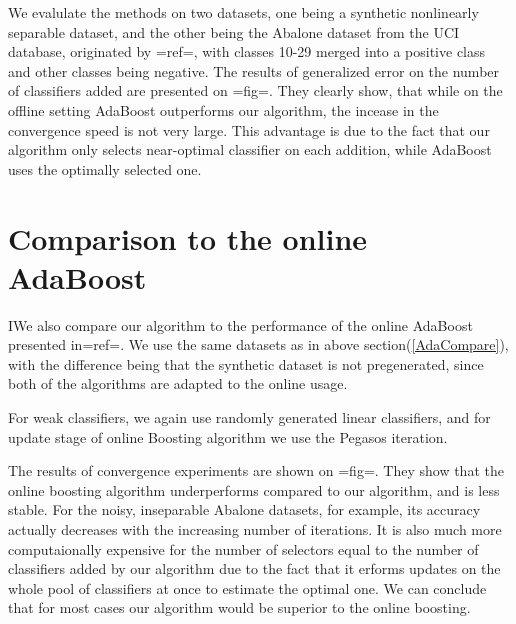 We evalulate the methods on two datasets, one being a synthetic nonlinearly separable dataset, and the other  being the Abalone dataset from the UCI database, originated by {{=ref=}}, with classes 10-29 merged into a positive class and other classes being negative. The results of generalized error on the number of classifiers added are presented on {{=fig=}}. They clearly show, that while on the offline setting AdaBoost outperforms our algorithm, the incease in the convergence speed is not very large. This advantage is due to the fact that our algorithm only selects near-optimal classifier on each addition, while AdaBoost uses the optimally selected one. 
\section{Comparison to the online AdaBoost}

IWe also compare our algorithm to the performance of the online AdaBoost presented in{{=ref=}}. We use the same datasets as in above section(\ref{AdaCompare}), with the difference being that the synthetic dataset is not pregenerated, since both of the algorithms are adapted to the online usage. 

For weak classifiers, we again use randomly generated linear classifiers, and for update stage of online Boosting algorithm we use the Pegasos iteration. 

The results of convergence experiments are shown on {{=fig=}}. They show that the online boosting algorithm underperforms compared to our algorithm, and is less stable. For the noisy, inseparable Abalone datasets, for example, its  accuracy actually decreases with the increasing number of iterations. 
It is also much more computaionally expensive for the number of selectors equal to the number of classifiers added by our algorithm due to the fact that it erforms updates on the whole pool of classifiers at once to estimate the optimal one. We can conclude that for most cases our algorithm would be superior to the online boosting.




